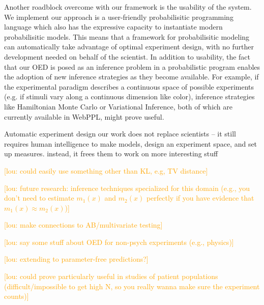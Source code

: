 \documentclass{article}
\newcommand{\lou}[1]{\textcolor{orange}{[lou: #1]}}
\newcommand{\cas}[1]{ \textsf{\color{darkgray} \scriptsize #1} }
\begin{document}
Another roadblock overcome with our framework is the usability of the system.
We implement our approach is a user-friendly probabilisitic programming language which also has the expressive capacity to instantiate modern probabilisitic models.
This means that a framework for probabilisitic modeling can automatically take advantage of optimal experiment design, with no further development needed on behalf of the scientist.
In addition to usability, the fact that our OED is posed as an inference problem in a probabilistic program enables the adoption of new inference strategies as they become available.
For example, if the experimental paradigm describes a continuous space of possible experiments (e.g. if stimuli vary along a continuous dimension like color), inference strategies like Hamiltonian Monte Carlo or Variational Inference, both of which are currently available in WebPPL, might prove useful.


Automatic experiment design
\cas{our work does not replace scientists -- it still requires human intelligence to make models, design an experiment space, and set up measures. instead, it frees them to work on more interesting stuff}

\lou{could easily use something other than KL, e.g, TV distance}

\lou{future research: inference techniques specialized for this domain (e.g., you don't need to estimate $m_1(x)$ and $m_2(x)$ perfectly if you have evidence that $m_1(x) \approx m_2(x)$)}

\lou{make connections to AB/multivariate testing}

\lou{say some stuff about OED for non-psych experiments (e.g., physics)}

\lou{extending to parameter-free predictions?}

\lou{could prove particularly useful in studies of patient populations (difficult/impossible to get high N, so you really wanna make sure the experiment counts)}



\end{document}
